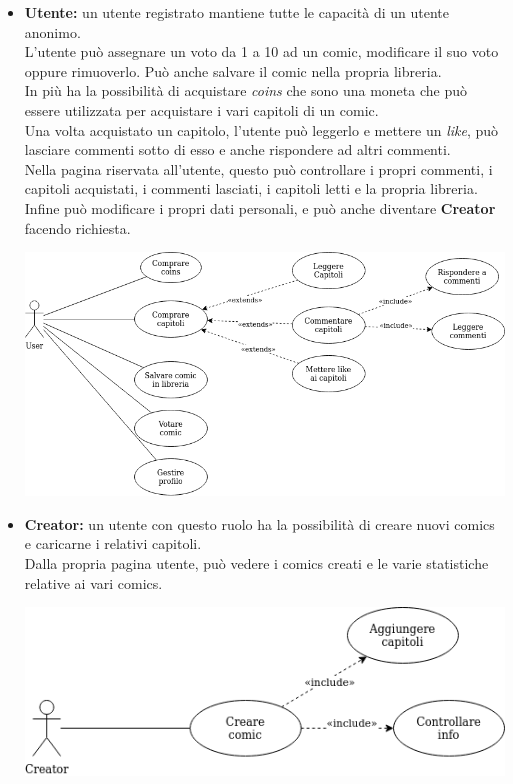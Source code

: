 \begin{itemize}
  \item \textbf{Utente:} un utente registrato mantiene tutte le capacità di un utente anonimo.
        \\ L'utente può assegnare un voto da 1 a 10 ad un comic, modificare il suo voto oppure rimuoverlo.
        Può anche salvare il comic nella propria libreria.
        \\In più ha la possibilità di acquistare \textit{coins} che sono una moneta che può essere utilizzata per acquistare
        i vari capitoli di un comic.
        \\ Una volta acquistato un capitolo, l'utente può leggerlo e mettere un \textit{like},
        può lasciare commenti sotto di esso e anche rispondere ad altri commenti.
        \\ Nella pagina riservata all'utente, questo può controllare i propri commenti, i capitoli acquistati,
        i commenti lasciati, i capitoli letti e la propria libreria.
        \\Infine può modificare i propri dati personali, e può anche diventare \textbf{Creator} facendo richiesta.


        \includegraphics[width=1\linewidth]{images/utente.png}

  \item \textbf{Creator:} un utente con questo ruolo ha la possibilità di creare nuovi comics e caricarne i relativi capitoli.
        \\ Dalla propria pagina utente, può vedere i comics creati e le varie statistiche relative ai vari comics.

        \includegraphics[width=1\linewidth]{images/creatore.png}

\end{itemize}
